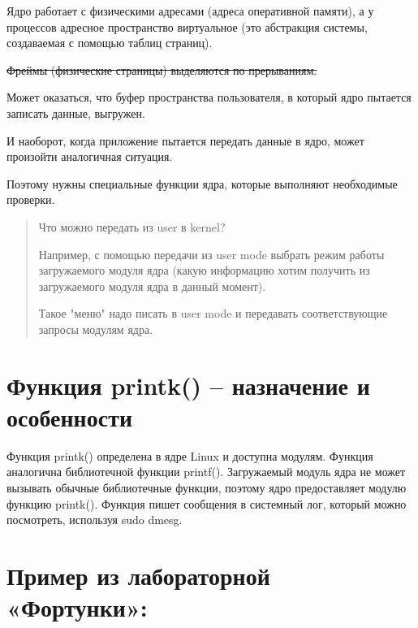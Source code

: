 Ядро работает с физическими адресами (адреса оперативной памяти), а у процессов адресное пространство виртуальное (это абстракция системы, создаваемая с помощью таблиц страниц).

\sout{Фреймы (физические страницы) выделяются по прерываниям.}

Может оказаться, что буфер пространства пользователя, в который ядро пытается записать данные, выгружен.

И наоборот, когда приложение пытается передать данные в ядро, может произойти аналогичная ситуация.

Поэтому нужны специальные функции ядра, которые выполняют необходимые проверки.

\begin{quote}
Что можно передать из user в kernel?

Например, с помощью передачи из user mode выбрать режим работы загружаемого модуля ядра (какую информацию хотим получить из загружаемого модуля ядра в данный момент).

Такое "меню" надо писать в user mode и передавать соответствующие запросы модулям ядра.
\end{quote}

\section{Функция printk() – назначение и особенности}
Функция printk() определена в ядре Linux и доступна модулям. Функция аналогична библиотечной функции printf(). Загружаемый модуль ядра не может вызывать обычные библиотечные функции, поэтому ядро предоставляет модулю функцию printk(). Функция пишет сообщения в системный лог, который можно посмотреть, используя sudo dmesg.

\section*{Пример из лабораторной «Фортунки»:}

